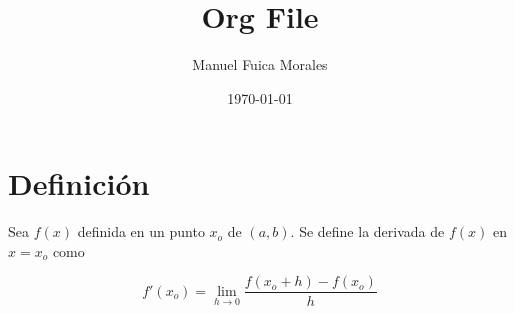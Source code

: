 \documentclass[a4paper,11pt,twoside,twocolumn]{article}
\author{Manuel Fuica Morales}
\date{\today}
\title{Org File}
\begin{document}
\maketitle
\tableofcontents \clearpage
\section{Definición}
\label{sec:orgcd5626d}
Sea \(f(x)\) definida en un punto \(x_o\) de \((a,b)\). Se define la derivada de
\(f(x)\) en \(x=x_o\) como

\[
f'(x_o)=\lim_{h \to 0}
\frac
{f(x_o+h) - f(x_o)}
{h}
\]
\end{document}
